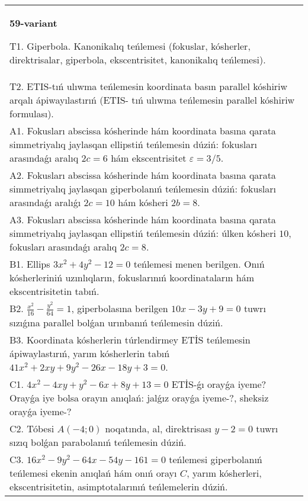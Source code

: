 \documentclass{article}
\begin{document}
\begin{tabular}{m{17cm}}
\textbf{59-variant}
\newline

T1. Giperbola. Kanonikalıq teńlemesi (fokuslar, kósherler, direktrisalar, giperbola, ekscentrisitet, kanonikalıq teńlemesi).\\

T2. ETIS-tıń ulıwma teńlemesin koordinata basın parallel kóshiriw arqalı ápiwayılastırıń (ETIS- tıń ulıwma teńlemesin parallel kóshiriw formulası).\\

A1. Fokusları abscissa kósherinde hám koordinata basına qarata simmetriyalıq jaylasqan ellipstiń teńlemesin dúziń: fokusları arasındaǵı aralıq $2 c=6$ hám ekscentrisitet $\varepsilon=3/5$.\\

A2. Fokusları abscissa kósherinde hám koordinata basına qarata simmetriyalıq jaylasqan giperbolanıń teńlemesin dúziń: fokusları arasındaǵı aralıǵı $2 c=10$ hám kósheri $2 b=8$.\\

A3. Fokusları abscissa kósherinde hám koordinata basına qarata simmetriyalıq jaylasqan ellipstiń teńlemesin dúziń: úlken kósheri $10$, fokusları arasındaǵı aralıq $2 c=8$.\\

B1. Ellips $3x^{2} + 4y^{2} - 12 = 0$ teńlemesi menen berilgen. Onıń kósherleriniń uzınlıqların, fokuslarınıń koordinataların hám ekscentrisitetin tabıń.  \\

B2. $\frac{x^{2}}{16} - \frac{y^{2}}{64} = 1$, giperbolasına berilgen $10x - 3y + 9 = 0$ tuwrı sızıǵına parallel bolǵan urınbanıń teńlemesin dúziń.  \\

B3. Koordinata kósherlerin túrlendirmey ETİS teńlemesin ápiwaylastırıń, yarım kósherlerin tabıń $41x^{2} + 2xy + 9y^{2} - 26x - 18y + 3 = 0$.  \\

C1. $4x^{2} - 4xy + y^{2} - 6x + 8y + 13 = 0$ ETİS-ǵı orayǵa iyeme? Orayǵa iye bolsa orayın anıqlań: jalǵız orayǵa iyeme-?, sheksiz orayǵa iyeme-?  \\

C2. Tóbesi $A(-4;0)$ noqatında, al, direktrisası $y - 2 = 0$ tuwrı sızıq bolǵan parabolanıń teńlemesin dúziń.\\

C3. $16x^{2} - 9y^{2} - 64x - 54y - 161 = 0$ teńlemesi giperbolanıń teńlemesi ekenin anıqlań hám onıń orayı $C$, yarım kósherleri, ekscentrisitetin, asimptotalarınıń teńlemelerin dúziń.  \\

\end{tabular}
\vspace{1cm}
\end{document}
